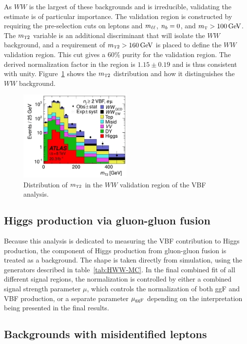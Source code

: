 As $WW$ is the largest of these backgrounds and is irreducible, validating the estimate is of particular importance. The validation region is constructed by requiring the pre-selection cuts on leptons and $m_{\ell\ell}$, $n_b = 0$, and $\mTH > 100 \GeV$. The $m_{\textrm{\footnotesize\sc t}2}$ variable\cite{mt2} is an additional discriminant that will isolate the $WW$ background, and a requirement of $\mTtwo > 160 \GeV$ is placed to define the $WW$ validation region. This cut gives a 60\% purity for the validation region. The derived normalization factor in the region is $1.15 \pm 0.19$ and is thus consistent with unity. Figure~\ref{fig:mt2} shows the $m_{\textrm{\footnotesize\sc t}2}$ distribution and how it distinguishes the $WW$ background.

\begin{figure}[h!]
  \centering
  \captionsetup{justification=centering}
  \includegraphics[width=0.5\textwidth]{figures/VBF_mT2}
  \caption{Distribution of $m_{\textrm{\footnotesize\sc t}2}$ in the $WW$ validation region of the VBF analysis\cite{WW2015}.}
  \label{fig:mt2}
\end{figure}

\subsection{Higgs production via gluon-gluon fusion}

Because this analysis is dedicated to measuring the VBF contribution to Higgs production, the component of Higgs production from gluon-gluon fusion is treated as a background. The shape is taken directly from simulation, using the generators described in table~\ref{tab:HWW-MC}. In the final combined fit of all different signal regions, the normalization is controlled by either a combined signal strength parameter $\mu$, which controls the normalization of both ggF and VBF production, or a separate parameter $\mu_{\rm ggF}$ depending on the interpretation being presented in the final results.  

\subsection{Backgrounds with misidentified leptons}


